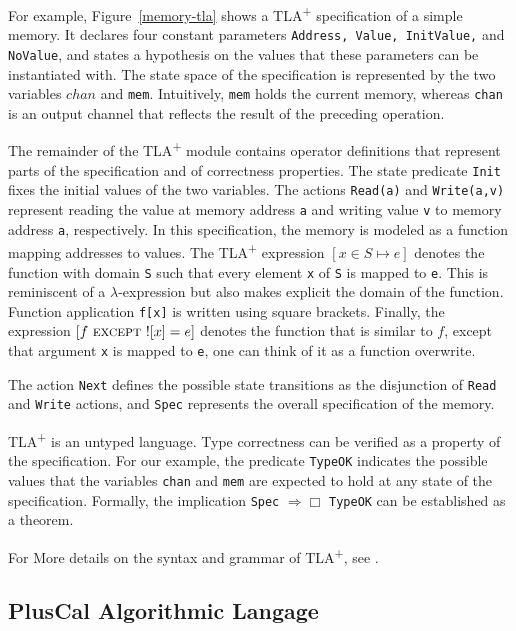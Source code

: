 \documentclass{article}
\newcommand{\tlaplus}{TLA\textsuperscript{+}\xspace}
\newcommand{\EXCEPT}{\textsc{except}}
\begin{document}
For example, Figure~\ref{memory-tla} shows a \tlaplus specification of a simple memory. It declares four constant parameters \verb|Address, Value, InitValue,| and \verb|NoValue|, and states a hypothesis on the values that these parameters can be instantiated with. The state space of the specification is represented by the two variables $chan$ and \verb|mem|. Intuitively, \verb|mem| holds the current memory, whereas \verb|chan| is an output channel that reflects the result of the preceding operation.

The remainder of the \tlaplus module contains operator definitions that represent parts of the specification and of correctness properties. The state predicate \verb|Init| fixes the initial values of the two variables. The actions \verb|Read(a)| and \verb|Write(a,v)| represent reading the value at memory address \verb|a| and writing value \verb|v| to memory address \verb|a|, respectively. In this specification, the memory is modeled as a function mapping addresses to values. The \tlaplus expression $[x \in S \mapsto e]$ denotes the function with domain \verb|S| such that every element \verb|x| of \verb|S| is mapped to \verb|e|. This is reminiscent of a $\lambda$-expression but also makes explicit the domain of the function. Function application \verb|f[x]| is written using square brackets. Finally, the expression $[f\ \EXCEPT\ ![x] = e]$ denotes the function that is similar to $f$, except that argument \verb|x| is mapped to \verb|e|, one can think of it as a function overwrite.


The action \verb|Next| defines the possible state transitions as the disjunction of \verb|Read| and \verb|Write| actions, and \verb|Spec| represents the overall specification of the memory.

\tlaplus is an untyped language. Type correctness can be verified as a property of the specification. For our example, the predicate \verb|TypeOK| indicates the possible values that the variables \verb|chan| and \verb|mem| are expected to hold at any state of the specification. Formally, the implication \verb|Spec| $\Rightarrow \Box$ \verb|TypeOK| can be established as a theorem.

\bigskip


For More details on the syntax and grammar of \tlaplus, see \cite{tlabook} \cite{tlaplus}.

\subsection{PlusCal Algorithmic Langage}
\end{document}
